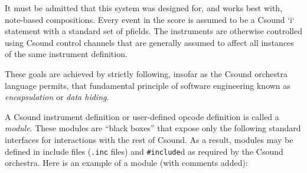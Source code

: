 \documentclass[12pt,letterpaper,onecolumn]{scrartcl}
\begin{document}
It must be admitted that this system was designed for, and works best with,
note-based compositions. Every event in the score is assumed to be a Csound
`i` statement with a standard set of pfields. The instruments are otherwise
controlled using Csound control channels that are generally assumed to affect
all instances of the same instrument definition.

These goals are achieved by strictly following, insofar as the
Csound
orchestra language permits, that fundamental principle of software engineering
known as \emph{encapsulation} or \emph{data hiding}.

A Csound instrument definition or user-defined opcode definition is called a
\emph{module}. These modules are ``black boxes'' that expose only the following
standard interfaces for interactions with the rest of Csound. As a result,
modules may be defined in include files (\texttt{.inc} files) and
\texttt{\#include}d as required by the Csound orchestra. Here is an example of
a module (with comments added):
\end{document}
